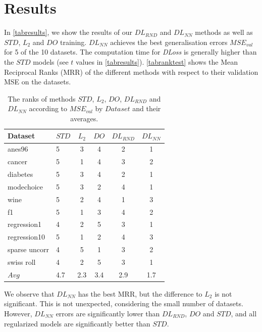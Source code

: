 \documentclass[conference]{IEEEtran}
\begin{document}
\section{Results}\label{sec:results}

In \autoref{tabresults}, we show the results of our $DL_{RND}$ and $DL_{NN}$ methods as well as $STD$, $L_2$ and $DO$ training. 
$DL_{NN}$ achieves the best generalisation errors $MSE_{val}$ for 5 of the 10 datasets.
The computation time for \emph{DLoss} is generally higher than the $STD$ models (see $t$ values in \autoref{tabresults}).
\autoref{tabranktest} shows the Mean Reciprocal Ranks (MRR) of the different methods with respect to their validation MSE on the datasets. 

\begin{table}[h]
 \begin{center}
 \begin{small}
 \begin{sc}
 \begin{tabular}{llcccc}
 
 \toprule

Dataset & $STD$ & $L_2$& $DO$& $DL_{RND}$& $DL_{NN}$\\

 \midrule
 anes96 & 5 & 3& 4& 2& 1\\
 cancer & 5 & 1& 4& 3& 2\\
 diabetes & 5 & 3& 4& 2& 1\\
 modechoice & 5 & 3& 2& 4& 1\\
 wine & 5& 2& 4& 1& 3\\
 f1 & 5& 1& 3& 4& 2\\
 regression1 & 4& 2& 5& 3& 1 \\
 regression10& 5& 1& 2& 4& 3 \\
 sparse uncorr & 4& 5& 1& 3& 2 \\
 swiss roll & 4& 2& 5& 3& 1 \\
 \hline
 $Avg$& 4.7 & 2.3& 3.4& 2.9& 1.7 \\ 
 \bottomrule
 
 \end{tabular}
 \end{sc}
 \end{small}
 \end{center}
 \caption{The ranks of methods $STD$, $L_2$, $DO$, $DL_{RND}$ and $DL_{NN}$ according to $MSE_{val}$ by $Dataset$ and their averages.}
 \label{tabrank} 
\end{table}

We observe that $DL_{NN}$ has the best MRR, but the difference to $L_2$ is not significant. 
This is not unexpected, considering the small number of datasets. 
However, $DL_{NN}$ errors are significantly lower than $DL_{RND}$, $DO$ and $STD$, and all regularized models are significantly better than $STD$.
\end{document}
